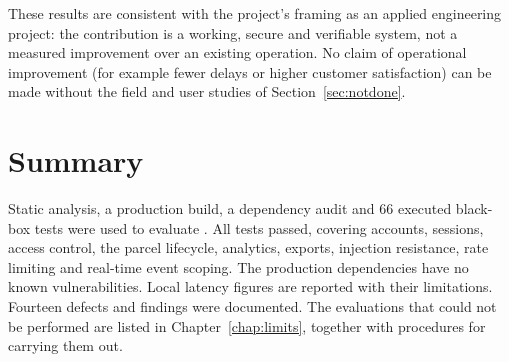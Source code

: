 These results are consistent with the project's framing as an applied engineering project: the contribution is a working, secure and verifiable system, not a measured improvement over an existing operation. No claim of operational improvement (for example fewer delays or higher customer satisfaction) can be made without the field and user studies of Section~\ref{sec:notdone}.

\section{Summary}

Static analysis, a production build, a dependency audit and 66 executed black-box tests were used to evaluate \scpms. All tests passed, covering accounts, sessions, access control, the parcel lifecycle, analytics, exports, injection resistance, rate limiting and real-time event scoping. The production dependencies have no known vulnerabilities. Local latency figures are reported with their limitations. Fourteen defects and findings were documented. The evaluations that could not be performed are listed in Chapter~\ref{chap:limits}, together with procedures for carrying them out.
